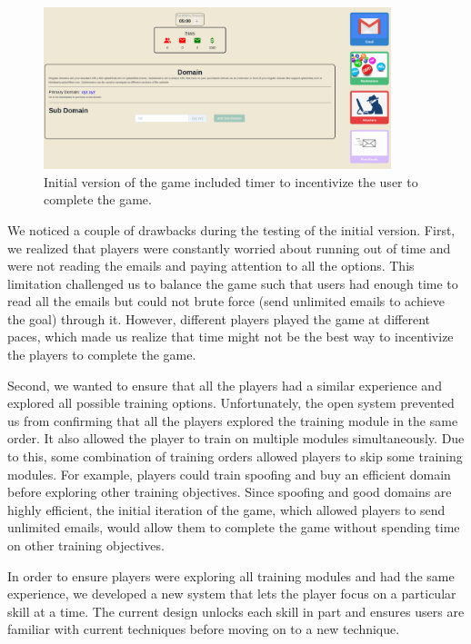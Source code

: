 \begin{figure}[!ht]
    \centering
    \includegraphics[width=0.9\textwidth]{figures/section2/game_initial.png}
    \caption[Initial version of the game]{Initial version of the game included timer to incentivize the user to complete the game.}
\end{figure}

We noticed a couple of drawbacks during the testing of the initial version. First, we realized that players were constantly worried about running out of time and were not reading the emails and paying attention to all the options. This limitation challenged us to balance the game such that users had enough time to read all the emails but could not brute force (send unlimited emails to achieve the goal) through it. However, different players played the game at different paces, which made us realize that time might not be the best way to incentivize the players to complete the game.

Second, we wanted to ensure that all the players had a similar experience and explored all possible training options. Unfortunately, the open system prevented us from confirming that all the players explored the training module in the same order. It also allowed the player to train on multiple modules simultaneously. Due to this, some combination of training orders allowed players to skip some training modules. For example, players could train spoofing and buy an efficient domain before exploring other training objectives. Since spoofing and good domains are highly efficient, the initial iteration of the game, which allowed players to send unlimited emails, would allow them to complete the game without spending time on other training objectives.

In order to ensure players were exploring all training modules and had the same experience, we developed a new system that lets the player focus on a particular skill at a time. The current design unlocks each skill in part and ensures users are familiar with current techniques before moving on to a new technique.

